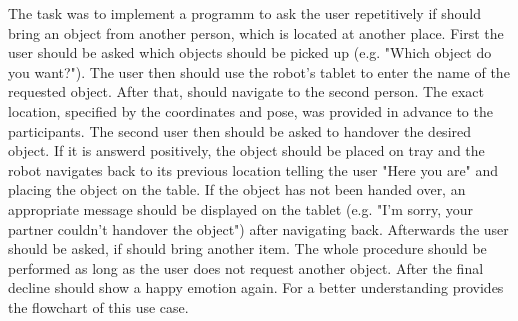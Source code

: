 The task was to implement a programm to ask the user repetitively if \hobbit{} should bring an object from another person, which is located at another place. First the user should be asked which objects should be picked up (e.g. "Which object do you want?"). The user then should use the robot's tablet to enter the name of the requested object. After that, \hobbit{} should navigate to the second person. The exact location, specified by the coordinates and pose, was provided in advance to the participants. The second user then should be asked to handover the desired object. If it is answerd positively, the object should be placed on \hobbit{} tray and the robot navigates back to its previous location telling the user "Here you are" and placing the object on the table. If the object has not been handed over, an appropriate message should be displayed on the tablet (e.g. "I'm sorry, your partner couldn't handover the object") after navigating back. Afterwards the user should be asked, if \hobbit{} should bring another item. The whole procedure should be performed as long as the user does not request another object. After the final decline \hobbit{} should show a happy emotion again. For a better understanding  provides the flowchart of this use case. \\



